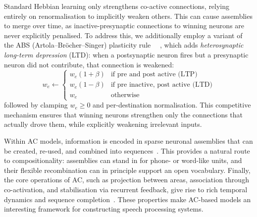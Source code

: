 Standard Hebbian learning only strengthens co-active connections, relying entirely on renormalisation to implicitly weaken others. This can cause assemblies to merge over time, as inactive-presynaptic connections to winning neurons are never explicitly penalised. To address this, we additionally employ a variant of the ABS (Artola--Br\"ocher--Singer) plasticity rule ~\cite{Artola1990-gk}~\cite{garagnaniRecruitmentConsolidationCell2009}, which adds \textit{heterosynaptic long-term depression} (LTD): when a postsynaptic neuron fires but a presynaptic neuron did not contribute, that connection is weakened:
\begin{equation}\label{eq:abs}
    w_e \leftarrow \begin{cases}
        w_e(1{+}\beta) & \text{if pre and post active (LTP)} \\
        w_e(1{-}\beta) & \text{if pre inactive, post active (LTD)} \\
        w_e & \text{otherwise}
    \end{cases}
\end{equation}
followed by clamping $w_e \geq 0$ and per-destination normalisation. This competitive mechanism ensures that winning neurons strengthen only the connections that actually drove them, while explicitly weakening irrelevant inputs.


Within AC models, information is encoded in sparse neuronal assemblies that can be created, re-used, and combined into sequences~\cite{dabagiaComputationSequencesAssemblies2024}. This provides a natural route to compositionality: assemblies can stand in for phone- or word-like units, and their flexible recombination can in principle support an open vocabulary. Finally, the core operations of AC, such as projection between areas, association through co-activation, and stabilisation via recurrent feedback, give rise to rich temporal dynamics and sequence completion~\cite{dabagiaComputationSequencesAssemblies2024}. These properties make AC-based models an interesting framework for constructing speech processing systems.
